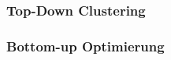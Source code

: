 \subsubsection{Top-Down Clustering}
\label{sec:2methoden}
%
%
%
%
%



\subsubsection{Bottom-up Optimierung}
\label{sec:2methoden}
%
%
%
%

\vspace{1cm}
